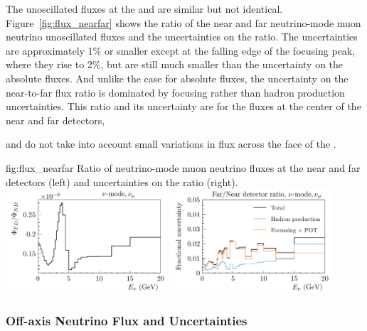 The unoscillated fluxes at the  and  are similar but not identical. Figure~\ref{fig:flux_nearfar} shows the ratio of the near and far neutrino-mode muon neutrino unoscillated fluxes %
and the uncertainties on the ratio.  The uncertainties are approximately 1\% or smaller except at the falling edge of the focusing peak, where they rise to 2\%, but are still much smaller than the uncertainty on the absolute fluxes.    And unlike the case for absolute fluxes, the uncertainty on the near-to-far flux ratio is dominated by focusing rather than hadron production uncertainties.  This ratio and its uncertainty are for the fluxes at the center of the near and far detectors,

and do not take into account small variations in flux across the face of the .     

\begin{dunefigure}{fig:flux_nearfar}
{Ratio of neutrino-mode muon neutrino fluxes at the near and far detectors (left) and uncertainties on the ratio (right). }
    \includegraphics[width=0.45\textwidth]{graphics/NDFD_ratio_left.pdf}
     \includegraphics[width=0.45\textwidth]{graphics/HP_NonHP_FDND_Ratio_ErrBreakdown_right.pdf}

\end{dunefigure}



\subsubsection{Off-axis Neutrino Flux and Uncertainties}



